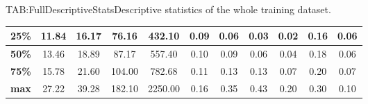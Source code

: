 \begin{landscape}
\begin{table}[Complete Descriptive Statistics]{TAB:FullDescriptiveStats}{Descriptive statistics of the whole training dataset.}
\begin{adjustbox}{width=1\linewidth}
\begin{tabular}{|c|*{10}{c|}}
                \hline
                \textbf{25\%}    & 11.84                          & 16.17                           & 76.16                             & 432.10                       & 0.09                               & 0.06                                & 0.03                              & 0.02                                   & 0.16                             & 0.06                                      \\
                \hline
                \textbf{50\%}    & 13.46                          & 18.89                           & 87.17                             & 557.40                       & 0.10                               & 0.09                                & 0.06                              & 0.04                                   & 0.18                             & 0.06                                      \\
                \hline
                \textbf{75\%}    & 15.78                          & 21.60                           & 104.00                            & 782.68                       & 0.11                               & 0.13                                & 0.13                              & 0.07                                   & 0.20                             & 0.07                                      \\
                \hline
                \textbf{max}     & 27.22                          & 39.28                           & 182.10                            & 2250.00                      & 0.16                               & 0.35                                & 0.43                              & 0.20                                   & 0.30                             & 0.10                                      \\
                \hline
            \end{tabular}
            
        \end{adjustbox}

        \bigskip
        

\end{table}
\end{landscape}
